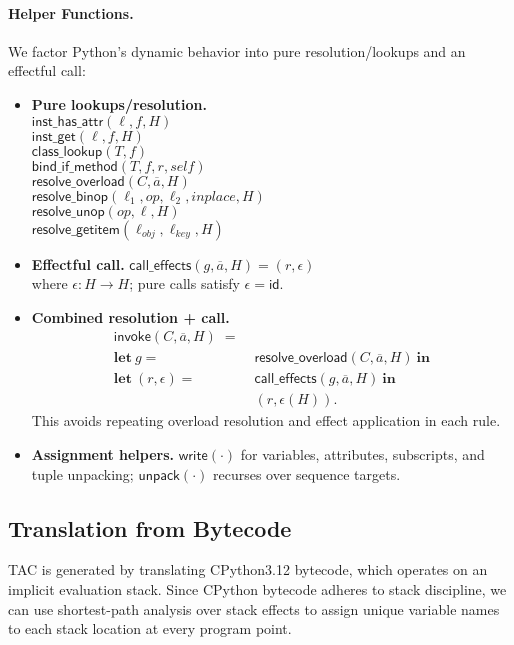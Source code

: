 \paragraph{Helper Functions.}
We factor Python’s dynamic behavior into pure resolution/lookups and an effectful call:

\begin{itemize}
  \item \textbf{Pure lookups/resolution.} \\
    \(\mathsf{inst\_has\_attr}(\ell,f,H)\) \\
    \(\mathsf{inst\_get}(\ell,f,H)\) \\
    \(\mathsf{class\_lookup}(T,f)\) \\
    \(\mathsf{bind\_if\_method}(T,f,r,\mathit{self})\) \\
    \(\mathsf{resolve\_overload}(C,\overline{a},H)\) \\
    \(\mathsf{resolve\_binop}(\ell_1,op,\ell_2,\mathit{inplace},H)\) \\
    \(\mathsf{resolve\_unop}(op,\ell,H)\) \\
    \(\mathsf{resolve\_getitem}(\ell_{\mathit{obj}},\ell_{\mathit{key}},H)\) \\
  \item \textbf{Effectful call.} \(\mathsf{call\_effects}(g,\overline{a},H) = (r,\epsilon)\)   \\
    where \(\epsilon : H \to H\); pure calls satisfy \(\epsilon = \mathsf{id}\).
  \item \textbf{Combined resolution + call.}
    \begin{align*}
      \mathsf{invoke}(C,\overline{a},H)
      \;=\; & \\
      \mathbf{let}\ g = & \mathsf{resolve\_overload}(C,\overline{a},H)\ \mathbf{in} \\
      \mathbf{let}\ (r,\epsilon) = & \mathsf{call\_effects}(g,\overline{a},H)\ \mathbf{in} \\
      & (r,\epsilon(H)).
    \end{align*}
    This avoids repeating overload resolution and effect application in each rule.
  \item \textbf{Assignment helpers.}
    \(\mathsf{write}(\cdot)\) for variables, attributes, subscripts, and tuple unpacking;
    \(\mathsf{unpack}(\cdot)\) recurses over sequence targets.
\end{itemize}

\subsection{Translation from Bytecode}
\label{sec:translation}
TAC is generated by translating CPython3.12 bytecode, which operates on an implicit evaluation stack. Since CPython bytecode adheres to stack discipline, we can use shortest-path analysis over stack effects to assign unique variable names to each stack location at every program point.

